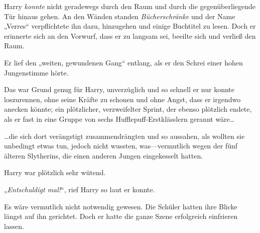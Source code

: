Harry \emph{konnte} nicht geradewegs durch den Raum und durch die gegenüberliegende Tür hinaus gehen. An den Wänden standen \emph{Bücherschränke} und der Name „Verres“ verpflichtete ihn dazu, hinzugehen und einige Buchtitel zu lesen. Doch er erinnerte sich an den Vorwurf, dass er zu langsam sei, beeilte sich und verließ den Raum.

Er lief den „weiten, gewundenen Gang“ entlang, als er den Schrei einer hohen Jungenstimme hörte.

Das war Grund genug für Harry, unverzüglich und so schnell er nur konnte loszurennen, ohne seine Kräfte zu schonen und ohne Angst, dass er irgendwo anecken könnte; ein plötzlicher, verzweifelter Sprint, der ebenso plötzlich endete, als er fast in eine Gruppe von sechs Hufflepuff-Erstklässlern gerannt wäre…

…die sich dort verängstigt zusammendrängten und so aussahen, als wollten sie unbedingt etwas tun, jedoch nicht wussten, was—vermutlich wegen der fünf älteren Slytherins, die einen anderen Jungen eingekesselt hatten.

Harry war plötzlich sehr wütend.

„\emph{Entschuldigt mal!}“, rief Harry so laut er konnte.

Es wäre vermutlich nicht notwendig gewesen. Die Schüler hatten ihre Blicke längst auf ihn gerichtet. Doch er hatte die ganze Szene erfolgreich einfrieren lassen.

